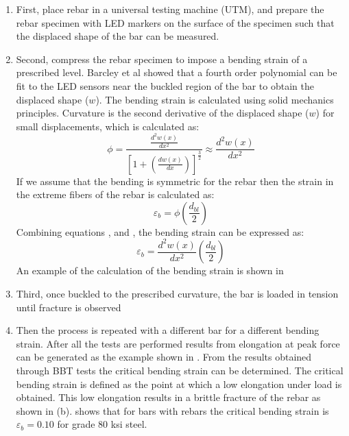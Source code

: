 \begin{enumerate}
    \item First, place rebar in a universal testing machine (UTM), and prepare the rebar specimen with LED markers on the surface of the specimen such that the displaced shape of the bar can be measured.
    \item Second, compress the rebar specimen to impose a bending strain of a prescribed level. Barcley et al showed that a fourth order polynomial can be fit to the LED sensors near the buckled region of the bar to obtain the displaced shape ($w$). The bending strain is calculated using solid mechanics principles. Curvature is the second derivative of the displaced shape ($w$) for small displacements, which is calculated as: 
    \begin{equation}
        \phi=\frac{\frac{d^2w(x)}{dx^2}}{\left[1+\left(\frac{dw(x)}{dx}\right)\right]^\frac{3}{2}}\approx \frac{d^2w(x)}{dx^2}
        \label{eq.CuvatureAprox}
    \end{equation}
    If we assume that the bending is symmetric for the rebar then the strain in the extreme fibers of the rebar is calculated as:
    \begin{equation}
        \varepsilon_{b}=\phi\left(\frac{d_{bl}}{2}\right) 
        \label{eq.BendingStrain}
    \end{equation}    
    Combining equations , and , the bending strain can be expressed as:
    \begin{equation}
        \varepsilon_{b}=\frac{d^2w(x)}{dx^2}\left(\frac{d_{bl}}{2}\right) 
        \label{eq.BendingStrainExpanded}
    \end{equation}
    An example of the calculation of the bending strain is shown in 
    \item Third, once buckled to the prescribed curvature, the bar is loaded in tension until fracture is observed
    \item Then the process is repeated with a different bar for a different bending strain. After all the tests are performed results from elongation at peak force can be generated as the example shown in . From the results obtained through BBT tests the critical bending strain can be determined. The critical bending strain is defined as the point at which a low elongation under load is obtained. This low elongation results in a brittle fracture of the rebar as shown in (b).  shows that for bars with rebars the critical bending strain is $\varepsilon_{b}=0.10$ for grade 80 ksi steel.
\end{enumerate}

